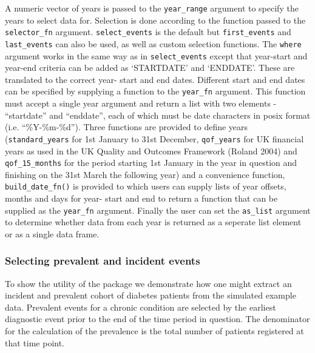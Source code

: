 \documentclass[]{article}
\begin{document}
A numeric vector of years is passed to the \texttt{year\_range} argument
to specify the years to select data for. Selection is done according to
the function passed to the \texttt{selector\_fn} argument.
\texttt{select\_events} is the default but \texttt{first\_events} and
\texttt{last\_events} can also be used, as well as custom selection
functions. The \texttt{where} argument works in the same way as in
\texttt{select\_events} except that year-start and year-end criteria can
be added as `STARTDATE' and `ENDDATE'. These are translated to the
correct year- start and end dates. Different start and end dates can be
specified by supplying a function to the \texttt{year\_fn} argument.
This function must accept a single year argument and return a list with
two elements - ``startdate'' and ``enddate'', each of which must be date
characters in posix format (i.e. ``\%Y-\%m-\%d''). Three functions are
provided to define years (\texttt{standard\_years} for 1st January to
31st December, \texttt{qof\_years} for UK financial years as used in the
UK Quality and Outcomes Framework (Roland 2004) and
\texttt{qof\_15\_months} for the period starting 1st January in the year
in question and finishing on the 31st March the following year) and a
convenience function, \texttt{build\_date\_fn()} is provided to which
users can supply lists of year offsets, months and days for year- start
and end to return a function that can be supplied as the
\texttt{year\_fn} argument. Finally the user can set the
\texttt{as\_list} argument to determine whether data from each year is
returned as a seperate list element or as a single data frame.

\subsubsection{Selecting prevalent and incident
events}\label{selecting-prevalent-and-incident-events}

To show the utility of the package we demonstrate how one might extract
an incident and prevalent cohort of diabetes patients from the simulated
example data. Prevalent events for a chronic condition are selected by
the earliest diagnostic event prior to the end of the time period in
question. The denominator for the calculation of the prevalence is the
total number of patients registered at that time point.
\end{document}

